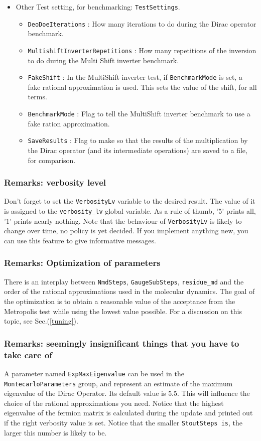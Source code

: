 \begin{itemize}
\item{Other Test setting, for benchmarking: \verb|TestSettings|.}
\begin{itemize}
\item \verb|DeoDoeIterations| : How many iterations to do during the Dirac operator benchmark.
\item \verb|MultishiftInverterRepetitions| : How many repetitions of the inversion to do
during the Multi Shift inverter benchmark.
\item \verb|FakeShift| : In the MultiShift inverter test, if \verb|BenchmarkMode| is set, a fake rational approximation is used. This sets the value of the shift, for all terms.
\item \verb|BenchmarkMode| : Flag to tell the MultiShift inverter benchmark to use a fake ration approximation.
\item \verb|SaveResults| : Flag to make so that the results of the multiplication by the Dirac operator (and its intermediate operations) are saved to a file, for comparison. 


\end{itemize}
\end{itemize}


\subsubsection{Remarks: verbosity level}
Don't forget to set the \verb|VerbosityLv| variable to the desired result. 
The value of it is assigned to the \verb|verbosity_lv| global variable.
As a rule of thumb, '5' prints all, '1' prints nearly nothing. Note
that the behaviour of \verb|VerbosityLv| is likely to change over time, no
policy is yet decided. If you implement anything new, you can use this 
feature to give informative messages.

\subsubsection{Remarks: Optimization of parameters}

There is an interplay between \verb|NmdSteps|, \verb|GaugeSubSteps|,
\verb|residue_md| and the order of the rational approximations used in the 
molecular dynamics. The goal of the optimization is to obtain a reasonable 
value of the acceptance from the Metropolis test while using the lowest value 
possible. For a discussion on this topic, see Sec.(\ref{tuning}).

\subsubsection{Remarks: seemingly insignificant things that you have to take 
care of}
A parameter named \verb|ExpMaxEigenvalue| can be used in the 
\verb|MontecarloParameters| group, and represent an estimate
of the maximum eigenvalue of the Dirac Operator. Its default value is $5.5$.  
This will influence  the choice of the rational approximations you need. 
Notice that the highest eigenvalue of the fermion matrix is calculated during 
the update and printed out if the right verbosity value is set. Notice that the 
smaller \verb|StoutSteps is|, the larger this number is likely to be. 

